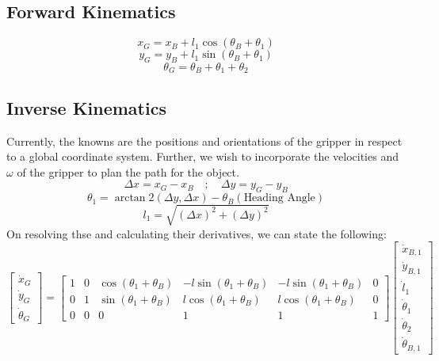 \documentclass[12pt,english]{report}
\begin{document}
\subsection{Forward Kinematics}
\[
x_G = x_B + l_1 \cos (\theta_B+ \theta_1)
\]
\[
y_G = y_B + l_1 \sin (\theta_B + \theta_1)\] 
\[
\theta_G = \theta_B + \theta_1 + \theta_2
\]
\subsection{Inverse Kinematics}
Currently, the knowns are the positions and orientations of the gripper in respect to a global coordinate system. Further, we wish to incorporate the velocities and $\omega$ of the gripper to plan the path for the object. 
\[
\Delta x = x_G - x_B \quad ; \quad \Delta y = y_G - y_B
\]
\[
\theta_1 = \arctan2(\Delta y, \Delta x) - \theta_B (\text{Heading Angle})
\]
\[
l_1 = \sqrt{(\Delta x) ^2 + (\Delta y)^2} 
\]
On resolving thse and calculating their derivatives, we can state the following:
\begin{equation}
\begin{bmatrix}
\dot{x}_G \\
\dot{y}_G \\
\dot{\theta}_G
\end{bmatrix}
=
\begin{bmatrix}
    1 & 0 & \cos (\theta_1 + \theta_B) & -l\sin (\theta_1 + \theta_B)& -l\sin (\theta_1 + \theta_B) & 0\\
    0 & 1 & \sin (\theta_1 +\theta_B) & l\cos (\theta_1 + \theta_B) & l\cos (\theta_1 +\theta_B) & 0 \\
    0 & 0 & 0 & 1 & 1 & 1
\end{bmatrix}
\begin{bmatrix}
\dot{x}_{B,1}\\
\dot{y}_{B,1}\\
\dot{l}_1 \\
\dot{\theta}_1 \\
\dot{\theta}_2 \\
\dot{\theta}_{B,1}
\end{bmatrix}
\end{equation}
\end{document}
